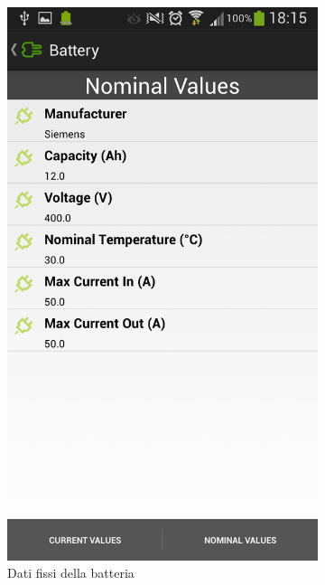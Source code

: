 \begin{figure}
\begin{subfigure}{0.45\textwidth}
		\includegraphics[width=\textwidth]{assets/mobile-app-battery-nom.png}
		\caption{Dati fissi della batteria}
		\label{fig:battery-nom}
    \end{subfigure}
    \begin{subfigure}{0.45\textwidth}

\end{subfigure}
\end{figure}
